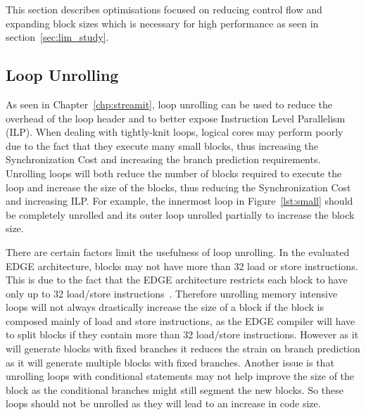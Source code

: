This section describes optimisations focused on reducing control flow and expanding block sizes which is necessary for high performance as seen in section~\ref{sec:lim_study}.

\subsection{Loop Unrolling}
As seen in Chapter~\ref{chp:streamit}, loop unrolling can be used to reduce the overhead of the loop header and to better expose Instruction Level Parallelism (ILP).
When dealing with tightly-knit loops, logical cores may perform poorly due to the fact that they execute many small blocks, thus increasing the Synchronization Cost and increasing the branch prediction requirements.
Unrolling loops will both reduce the number of blocks required to execute the loop and increase the size of the blocks, thus reducing the Synchronization Cost and increasing ILP.
For example, the innermost loop in Figure~\ref{lst:small} should be completely unrolled and its outer loop unrolled partially to increase the block size.

There are certain factors limit the usefulness of loop unrolling.
In the evaluated EDGE architecture, blocks may not have more than 32 load or store instructions.
This is due to the fact that the EDGE architecture restricts each block to have only up to 32 load/store instructions~\cite{putnam2010e2,smith2006edge}.
Therefore unrolling memory intensive loops will not always drastically increase the size of a block if the block is composed mainly of load and store instructions, as the EDGE compiler will have to split blocks if they contain more than 32 load/store instructions.
However as it will generate blocks with fixed branches it reduces the strain on branch prediction as it will generate multiple blocks with fixed branches.
Another issue is that unrolling loops with conditional statements may not help improve the size of the block as the conditional branches might still segment the new blocks.
So these loops should not be unrolled as they will lead to an increase in code size.


